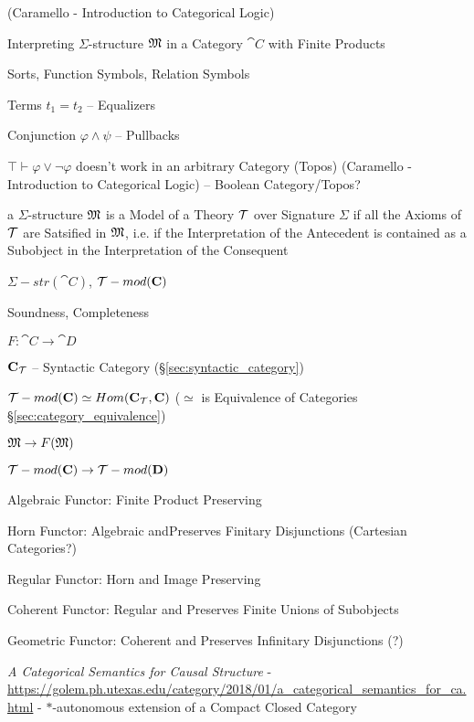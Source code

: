 \asterism


(Caramello - Introduction to Categorical Logic) %

Interpreting $\Sigma$-structure $\mathfrak{M}$ in a Category $\cat{C}$
with Finite Products

Sorts, Function Symbols, Relation Symbols

Terms $t_1 = t_2$ -- Equalizers

Conjunction $\varphi \wedge \psi$ -- Pullbacks

$\top \vdash \varphi \vee \neg\varphi$ doesn't work in an arbitrary
Category (Topos) (Caramello - Introduction to Categorical Logic) --
Boolean Category/Topos?

a $\Sigma$-structure $\mathfrak{M}$ is a Model of a Theory $\mathcal{T}$
over Signature $\Sigma$ if all the Axioms of $\mathcal{T}$ are Satsified
in $\mathfrak{M}$, i.e. if the Interpretation of the Antecedent is
contained as a Subobject in the Interpretation of the Consequent


$\Sigma-str(\cat{C})$, $\mathcal{T}-mod(\mathbf{C})$

Soundness, Completeness

$F : \cat{C} \rightarrow \cat{D}$

$\mathbf{C}_{\mathcal{T}}$ -- Syntactic Category
(\S\ref{sec:syntactic_category})

$\mathcal{T}-mod(\mathbf{C}) \simeq Hom(\mathbf{C}_{\mathcal{T}},\mathbf{C})$
($\simeq$ is Equivalence of Categories
\S\ref{sec:category_equivalence})

$\mathfrak{M} \rightarrow F(\mathfrak{M})$

$\mathcal{T}-mod(\mathbf{C}) \rightarrow \mathcal{T}-mod(\mathbf{D})$

Algebraic Functor: Finite Product Preserving

Horn Functor: Algebraic andPreserves Finitary Disjunctions (Cartesian
Categories?)

Regular Functor: Horn and Image Preserving

Coherent Functor: Regular and Preserves Finite Unions of Subobjects

Geometric Functor: Coherent and Preserves Infinitary Disjunctions (?)

\emph{A Categorical Semantics for Causal Structure} -
\url{https://golem.ph.utexas.edu/category/2018/01/a_categorical_semantics_for_ca.html}
- $*$-autonomous extension of a Compact Closed Category



